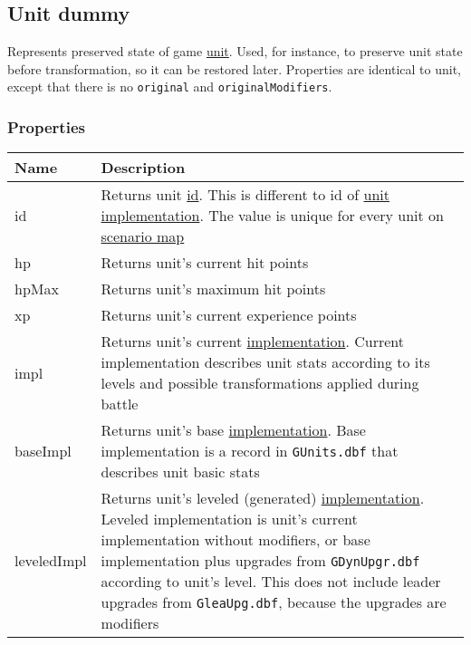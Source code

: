 \subsection{Unit dummy}
\label{UnitDummy}
Represents preserved state of game \hyperref[Unit]{unit}. Used, for instance, to preserve unit state before transformation, so it can be restored later. Properties are identical to unit, except that there is no \texttt{original} and \texttt{originalModifiers}.
\subsubsection{Properties}
\begin{center}
\begin{tabularx}{\linewidth}{| l | X |}
\hline
\textbf{Name} & \textbf{Description} \\
\hline
id & Returns unit \hyperref[Id]{id}. This is different to id of \hyperref[UnitImpl]{unit implementation}. The value is unique for every unit on \hyperref[Scenario]{scenario map}\\
\hline
hp & Returns unit's current hit points\\
\hline
hpMax & Returns unit's maximum hit points\\
\hline
xp & Returns unit's current experience points\\
\hline
impl & Returns unit's current \hyperref[UnitImpl]{implementation}. Current implementation describes unit stats according to its levels and possible transformations applied during battle\\
\hline
baseImpl & Returns unit's base \hyperref[UnitImpl]{implementation}. Base implementation is a record in \texttt{GUnits.dbf} that describes unit basic stats\\
\hline
leveledImpl & Returns unit's leveled (generated) \hyperref[UnitImpl]{implementation}. Leveled implementation is unit's current implementation without modifiers, or base implementation plus upgrades from \texttt{GDynUpgr.dbf} according to unit's level. This does not include leader upgrades from \texttt{GleaUpg.dbf}, because the upgrades are modifiers\\
\hline
\end{tabularx}
\end{center}